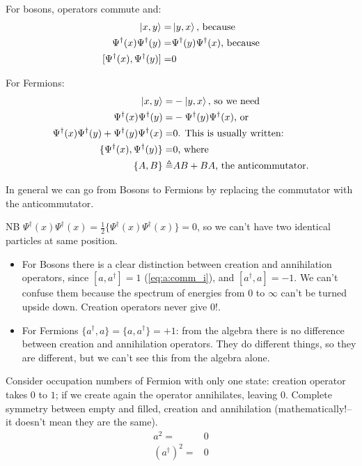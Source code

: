 \documentclass[]{article}
\begin{document}
For bosons, operators commute and:
\begin{align*}
	\ket{x,y}=&\ket{y,x} \text{, because}\\
	\Psi^\dagger(x)\Psi^\dagger(y)=&\Psi^\dagger(y)\Psi^\dagger(x) \text{, because}\\
	[\Psi^\dagger(x),\Psi^\dagger(y)]=&0
\end{align*}

For Fermions:
\begin{align*}
	\ket{x,y}=&-\ket{y,x} \text{, so we need}\\
	\Psi^\dagger(x)\Psi^\dagger(y)=& -\Psi^\dagger(y)\Psi^\dagger(x) \text{, or}\\
	\Psi^\dagger(x)\Psi^\dagger(y)+\Psi^\dagger(y)\Psi^\dagger(x)=&0 \text{. This is usually written:}\\
	\{\Psi^\dagger(x), \Psi^\dagger(y)\}=&0 \text{, where}\\
	\{A,B\}\triangleq& AB + BA \text{, the anticommutator.}
\end{align*}

In general we can go from Bosons to Fermions by replacing the commutator with the anticommutator.

NB  $\Psi^\dagger(x)\Psi^\dagger(x)=\frac{1}{2}\{\Psi^\dagger(x)\Psi^\dagger(x)\}=0$,  so we can't have two identical particles at same position.

\begin{itemize}
	\item For Bosons there is a clear distinction between creation and annihilation operators, since $[a,a^\dagger]=1$ (\ref{eq:a:comm_i}), and $[a^\dagger,a]=-1$. We can't confuse them because the spectrum of energies from $0$ to $\infty$ can't be turned upside down. Creation operators never give 0!.
	\item For Fermions $\{a^\dagger,a\}= \{a,a^\dagger\}=+1$: from the algebra there is no difference between creation and annihilation operators. They do different things, so they are different, but we can't see this from the algebra alone.
\end{itemize}

Consider occupation numbers of Fermion with only one state: creation operator takes $0$ to $1$; if we create again the operator  annihilates, leaving $0$. Complete symmetry between empty and filled, creation and annihilation (mathematically!--it doesn't mean they are the same).
\begin{align*}
	a^2=&0\\
	(a^\dagger)^2=&0
\end{align*}
\end{document}
